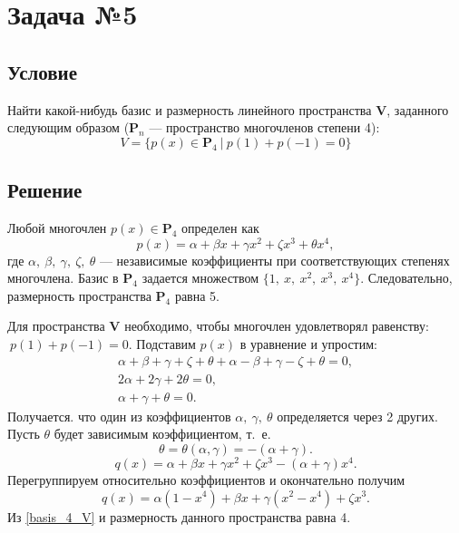 \documentclass[12pt, a4paper]{article}
\begin{document}
		\newpage
		\section{Задача №5}
		\subsection*{Условие}
		Найти какой-нибудь базис и размерность линейного пространства $\mathbf V$, заданного следующим образом ($\mathbf P_n$ --- пространство многочленов степени 4):
		$$
		V = \{ p(x) \in \mathbf P_4 \  | \ p(1) + p(-1) = 0 \}
		$$
		\subsection*{Решение}
		Любой многочлен $p(x) \in \mathbf P_4$ определен как
		$$
			p(x) = \alpha + \beta x + \gamma x^2 + \zeta x^3 + \theta x^4,
		$$
		где $\alpha,\ \beta,\ \gamma,\ \zeta,\ \theta$ --- независимые коэффициенты при соответствующих степенях многочлена. 
		Базис в $\mathbf P_4$ задается множеством $\{1,\ x,\ x^2,\ x^3,\ x^4\}$.
		Следовательно, размерность пространства $\mathbf P_4$ равна 5.	
			 
		Для пространства $\mathbf V$ необходимо, чтобы многочлен удовлетворял равенству:  $\ p(1) + p(-1) = 0$. Подставим $p(x)$ в уравнение и упростим: 
		\begin{gather*}
			\alpha + \beta + \gamma + \zeta + \theta + 
			\alpha - \beta + \gamma - \zeta + \theta = 0, \\
			2 \alpha + 2 \gamma + 2 \theta = 0, \\
			\alpha + \gamma + \theta = 0.
		\end{gather*}
		Получается. что один из коэффициентов $\alpha,\ \gamma,\ \theta$ определяется через 2 других. Пусть $\theta$ будет зависимым коэффициентом, т.~е.
		$$
		\theta = \theta (\alpha, \gamma) = - (\alpha + \gamma).
		$$
		\begin{equation*}
			q(x) = \alpha + \beta x + \gamma x^2 + \zeta x^3 - (\alpha + \gamma) x^4.
		\end{equation*}
		Перегруппируем относительно коэффициентов и окончательно получим
		\begin{equation}
			\label{basis_4_V}
			q(x) = \alpha (1 - x^4) + \beta x + \gamma (x^2 - x^4) + \zeta x^3.
		\end{equation}
		Из \eqref{basis_4_V} 
		и размерность данного пространства равна 4.
		
		
			
	

	
\end{document}
